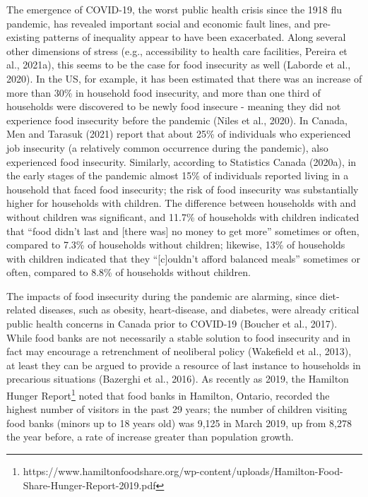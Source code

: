 \documentclass[]{elsarticle} %
\begin{document}
The emergence of COVID-19, the worst public health crisis since the 1918
flu pandemic, has revealed important social and economic fault lines,
and pre-existing patterns of inequality appear to have been exacerbated.
Along several other dimensions of stress (e.g., accessibility to health
care facilities, Pereira et al., 2021a), this seems to be the case for
food insecurity as well (Laborde et al., 2020). In the US, for example,
it has been estimated that there was an increase of more than 30\% in
household food insecurity, and more than one third of households were
discovered to be newly food insecure - meaning they did not experience
food insecurity before the pandemic (Niles et al., 2020). In Canada, Men
and Tarasuk (2021) report that about 25\% of individuals who experienced
job insecurity (a relatively common occurrence during the pandemic),
also experienced food insecurity. Similarly, according to Statistics
Canada (2020a), in the early stages of the pandemic almost 15\% of
individuals reported living in a household that faced food insecurity;
the risk of food insecurity was substantially higher for households with
children. The difference between households with and without children
was significant, and 11.7\% of households with children indicated that
``food didn't last and {[}there was{]} no money to get more'' sometimes
or often, compared to 7.3\% of households without children; likewise,
13\% of households with children indicated that they ``{[}c{]}ouldn't
afford balanced meals'' sometimes or often, compared to 8.8\% of
households without children.

The impacts of food insecurity during the pandemic are alarming, since
diet-related diseases, such as obesity, heart-disease, and diabetes,
were already critical public health concerns in Canada prior to COVID-19
(Boucher et al., 2017). While food banks are not necessarily a stable
solution to food insecurity and in fact may encourage a retrenchment of
neoliberal policy (Wakefield et al., 2013), at least they can be argued
to provide a resource of last instance to households in precarious
situations (Bazerghi et al., 2016). As recently as 2019, the Hamilton
Hunger Report\footnote{https://www.hamiltonfoodshare.org/wp-content/uploads/Hamilton-Food-Share-Hunger-Report-2019.pdf}
noted that food banks in Hamilton, Ontario, recorded the highest number
of visitors in the past 29 years; the number of children visiting food
banks (minors up to 18 years old) was 9,125 in March 2019, up from 8,278
the year before, a rate of increase greater than population growth.
\end{document}
